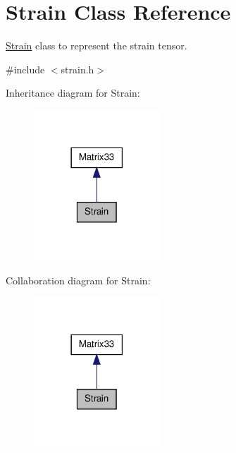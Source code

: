 \hypertarget{classStrain}{\section{\-Strain \-Class \-Reference}
\label{d1/d3c/classStrain}
}


\hyperlink{classStrain}{\-Strain} class to represent the strain tensor.  




{\ttfamily \#include $<$strain.\-h$>$}



\-Inheritance diagram for \-Strain\-:\nopagebreak
\begin{figure}[H]
\begin{center}
\leavevmode
\includegraphics[width=134pt]{d6/d0f/classStrain__inherit__graph}
\end{center}
\end{figure}


\-Collaboration diagram for \-Strain\-:\nopagebreak
\begin{figure}[H]
\begin{center}
\leavevmode
\includegraphics[width=134pt]{db/db8/classStrain__coll__graph}
\end{center}
\end{figure}
